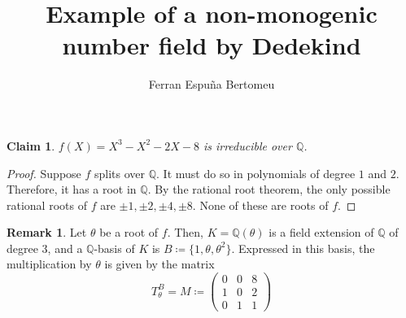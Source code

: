 \documentclass[11pt]{article}
\title{Example of a non-monogenic number field by Dedekind}
\author{Ferran Espuña Bertomeu}
\newtheorem{claim}[theorem]{Claim}
\theoremstyle{definition}
\newtheorem{rk}[theorem]{Remark}
\begin{document}
    \maketitle

    \begin{claim}
        $f(X)=X^3-X^2-2X-8$ is irreducible over $\mathbb{Q}$.
    \end{claim}
    \begin{proof}
        Suppose $f$ splits over $\mathbb{Q}$.
        It must do so in polynomials of degree $1$ and $2$.
        Therefore, it has a root in $\mathbb{Q}$.
        By the rational root theorem, the only possible rational roots of  $f$ are $\pm 1, \pm 2, \pm 4, \pm 8$.
        None of these are roots of $f$.
    \end{proof}

    \begin{rk}
        Let $\theta$ be a root of $f$.
        Then, $K = \mathbb{Q}(\theta)$ is a field extension of $\mathbb{Q}$ of degree $3$,
        and a $\mathbb{Q}$-basis of $K$ is $B \coloneqq \{1, \theta, \theta^2\}$. Expressed in this basis,
        the multiplication by $\theta$ is given by the matrix
        \[T_{\theta}^{B} = M \coloneqq
            \begin{pmatrix}
                0 & 0 & 8 \\
                1 & 0 & 2 \\
                0 & 1 & 1
            \end{pmatrix}
        \]
    \end{rk}
\end{document}
